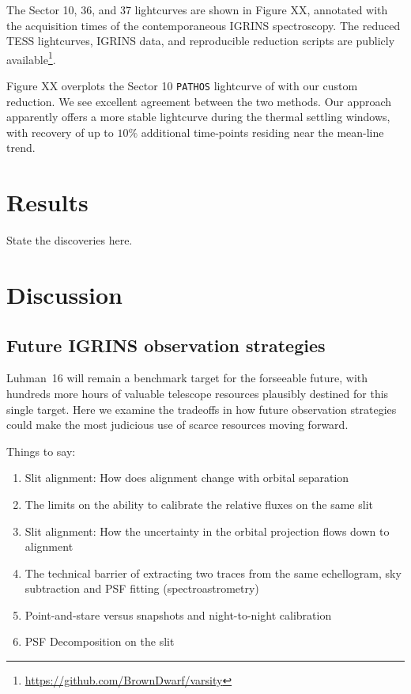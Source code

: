\documentclass[modern]{aastex631}
\begin{document}
The Sector 10, 36, and 37 lightcurves are shown in Figure XX, annotated with the acquisition times of the contemporaneous IGRINS spectroscopy.  The reduced TESS lightcurves, IGRINS data, and reproducible reduction scripts are publicly available\footnote{\url{https://github.com/BrownDwarf/varsity}}.

Figure XX overplots the Sector 10 \texttt{PATHOS} lightcurve of \citet{2021ApJ...906...64A} with our custom reduction.  We see excellent agreement between the two methods.  Our approach apparently offers a more stable lightcurve during the thermal settling windows, with recovery of up to $10\%$ additional time-points residing near the mean-line trend.

\section{Results}
State the discoveries here.

\section{Discussion}

\subsection{Future IGRINS observation strategies}
Luhman~16 will remain a benchmark target for the forseeable future, with hundreds more hours of valuable telescope resources plausibly destined for this single target.  Here we examine the tradeoffs in how future observation strategies could make the most judicious use of scarce resources moving forward.

Things to say:  
\begin{enumerate}
  \item Slit alignment: How does alignment change with orbital separation  
  \item The limits on the ability to calibrate the relative fluxes on the same slit  
  \item Slit alignment: How the uncertainty in the orbital projection flows down to alignment  
  \item The technical barrier of extracting two traces from the same echellogram, sky subtraction and PSF fitting (spectroastrometry)  
  \item Point-and-stare versus snapshots and night-to-night calibration 
  \item PSF Decomposition on the slit  
\end{enumerate}
\end{document}

